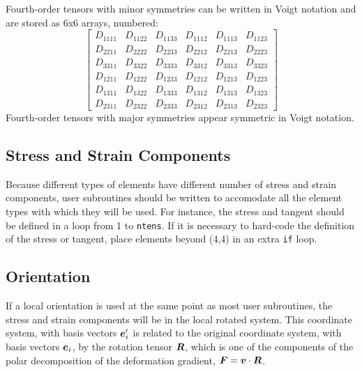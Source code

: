 \documentclass[10pt,letterpaper,oneside]{report}
\newcommand{\ten}[1]{\mbox{\boldmath $#1$}{}}
\begin{document}
Fourth-order tensors with minor symmetries can be written in Voigt notation and are stored as 6x6 arrays, numbered: 
\[\left[ \begin{array}{cccccc}
D_{1111} & D_{1122} & D_{1133} & D_{1112} & D_{1113} & D_{1123} \\
D_{2211} & D_{2222} & D_{2233} & D_{2212} & D_{2213} & D_{2223} \\
D_{3311} & D_{3322} & D_{3333} & D_{3312} & D_{3313} & D_{3323} \\
D_{1211} & D_{1222} & D_{1233} & D_{1212} & D_{1213} & D_{1223} \\
D_{1311} & D_{1322} & D_{1333} & D_{1312} & D_{1313} & D_{1323} \\
D_{2311} & D_{2322} & D_{2333} & D_{2312} & D_{2313} & D_{2323}
\end{array} \right] \]
Fourth-order tensors with major symmetries appear symmetric in Voigt notation.


\subsection{Stress and Strain Components}
Because different types of elements have different number of stress and strain components, user subroutines should be written to accomodate all the element types with which they will be used.  For instance, the stress and tangent should be defined in a loop from 1 to \texttt{ntens}.  If it is necessary to hard-code the definition of the stress or tangent, place elements beyond (4,4) in an extra \texttt{if} loop.  


\subsection{Orientation}
\label{subsec:orientation}

If a local orientation is used at the same point as most user subroutines, the stress and strain components will be in the local rotated system.  This coordinate system, with basis vectors $\ten{e}'_i$ is related to the original coordinate system, with basis vectors $\ten{e}_i$, by the rotation tensor $\ten{R}$, which is one of the components of the polar decomposition of the deformation gradient, $\ten{F} = \ten{v} \cdot \ten{R}$.  
\end{document}
